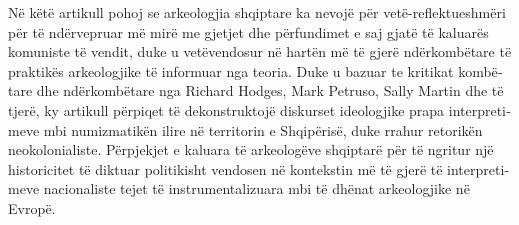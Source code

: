 \myseparator
\begin{myabstract}  
		\foreignlanguage{albanian}{
			Në këtë artikull pohoj se arkeologjia shqiptare ka nevojë për vetë-reflektueshmëri për të ndërve\-pruar më mirë me gjetjet dhe përfundimet e saj gjatë të kaluarës komuniste të vendit, duke u vetëvendosur në hartën më të gjerë ndërkombëtare të praktikës arkeologjike të informuar nga teoria. Duke u bazuar te kritikat kombëtare dhe ndërkombëtare nga Richard Hodges, Mark Petruso, Sally Martin dhe të tjerë, ky artikull përpiqet të dekonstruktojë diskurset ideologjike prapa interpretimeve mbi numizmatikën ilire në territorin e Shqipërisë, duke rrahur retorikën neokolonialiste. Përpjekjet e kaluara të arkeologëve shqiptarë për të ngritur një historicitet të diktuar politikisht vendosen në kontekstin më të gjerë të interpretimeve nacionaliste tejet të instrumentalizuara mbi të dhënat arkeologjike në Evropë.}
			
				
	\end{myabstract}


\printbibliography[heading=subbibnumbered] 
\label{bekteshi:lastpage}
\closingarticle
